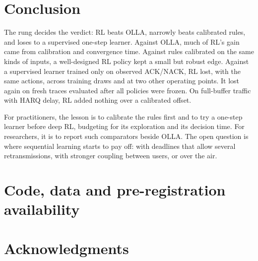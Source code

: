 \section{Conclusion}\label{sec:conclusion}
The rung decides the verdict: RL beats OLLA, narrowly beats calibrated rules, and loses to a supervised one-step learner. Against OLLA, much of RL's gain came from calibration and convergence time. Against rules calibrated on the same kinds of inputs, a well-designed RL policy kept a small but robust edge. Against a supervised learner trained only on observed ACK/NACK, RL lost, with the same actions, across training draws and at two other operating points. It lost again on fresh traces evaluated after all policies were frozen. On full-buffer traffic with HARQ delay, RL added nothing over a calibrated offset.

For practitioners, the lesson is to calibrate the rules first and to try a one-step learner before deep RL, budgeting for its exploration and its decision time. For researchers, it is to report such comparators beside OLLA. The open question is where sequential learning starts to pay off: with deadlines that allow several retransmissions, with stronger coupling between users, or over the air.

\section*{Code, data and pre-registration availability}

\section*{Acknowledgments}
